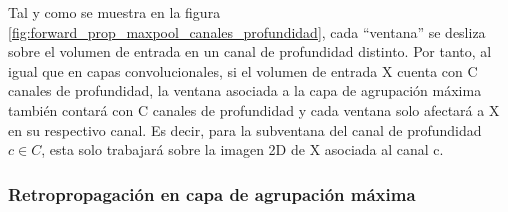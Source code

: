 Tal y como se muestra en la figura \ref{fig:forward_prop_maxpool_canales_profundidad}, cada ``ventana'' se desliza sobre el volumen de entrada en un canal de profundidad distinto. Por tanto, al igual que en capas convolucionales, si el volumen de entrada X cuenta con C canales de profundidad, la ventana asociada a la capa de agrupación máxima también contará con C canales de profundidad y cada ventana solo afectará a X en su respectivo canal. Es decir, para la subventana del canal de profundidad $c \in C$, esta solo trabajará sobre la imagen 2D de X asociada al canal c.

\subsubsection{Retropropagación en capa de agrupación máxima}

